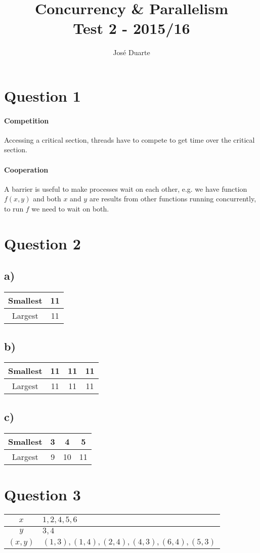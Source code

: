 \documentclass[a4paper,twocolumn]{article}
\author{José Duarte}
\title{Concurrency \& Parallelism\\Test 2 - 2015/16}
\begin{document}
\maketitle
\section{Question 1}
\paragraph{Competition}
Accessing a critical section, threads have to compete to get time over the critical section.
\paragraph{Cooperation}
A barrier is useful to make processes wait on each other,
e.g. we have function $f(x, y)$ and both $x$ and $y$ are results from other functions running concurrently,
to run $f$ we need to wait on both.
\section{Question 2}
\subsection{a)}
\begin{tabular}{c|c}
    Smallest & 11 \\
    \hline
    Largest  & 11 \\
\end{tabular}
\subsection{b)}
\begin{tabular}{c|c c c}
    Smallest & 11 & 11 & 11 \\
    \hline
    Largest  & 11 & 11 & 11 \\
\end{tabular}
\subsection{c)}
\begin{tabular}{c|c c c}
    Smallest & 3 & 4 & 5 \\
    \hline
    Largest  & 9 & 10 & 11\\
\end{tabular}
\section{Question 3}
\begin{tabular}{c | l}
    $x$ & $1, 2, 4, 5, 6$ \\
    \hline
    $y$ & $3, 4$ \\
    \hline
    $(x, y)$ & $(1, 3), (1, 4), (2, 4), (4, 3), (6, 4), (5, 3)$ \\
\end{tabular}
\end{document}
